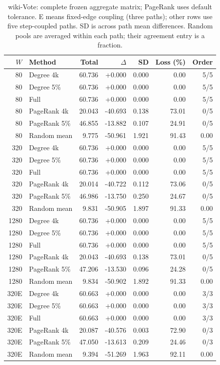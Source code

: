 \clearpage
\begin{table}[htbp]
\caption{wiki-Vote: complete frozen aggregate matrix; PageRank uses default tolerance. E means fixed-edge coupling (three paths); other rows use five step-coupled paths. SD is across path mean differences. Random pools are averaged within each path; their agreement entry is a fraction.}\label{tab:s-wiki_vote}
\begin{tabular}{rlrrrrr}
\toprule
$W$ & Method & Total & $\Delta$ & SD & Loss (\%) & Order \\
\midrule
80 & Degree 4k & 60.736 & +0.000 & 0.000 & 0.00 & 5/5 \\
80 & Degree 5\% & 60.736 & +0.000 & 0.000 & 0.00 & 5/5 \\
80 & Full & 60.736 & +0.000 & 0.000 & 0.00 & 5/5 \\
80 & PageRank 4k & 20.043 & -40.693 & 0.138 & 73.01 & 0/5 \\
80 & PageRank 5\% & 46.855 & -13.882 & 0.107 & 24.91 & 0/5 \\
80 & Random mean & 9.775 & -50.961 & 1.921 & 91.43 & 0.00 \\
320 & Degree 4k & 60.736 & +0.000 & 0.000 & 0.00 & 5/5 \\
320 & Degree 5\% & 60.736 & +0.000 & 0.000 & 0.00 & 5/5 \\
320 & Full & 60.736 & +0.000 & 0.000 & 0.00 & 5/5 \\
320 & PageRank 4k & 20.014 & -40.722 & 0.112 & 73.06 & 0/5 \\
320 & PageRank 5\% & 46.986 & -13.750 & 0.250 & 24.67 & 0/5 \\
320 & Random mean & 9.831 & -50.905 & 1.897 & 91.33 & 0.00 \\
1280 & Degree 4k & 60.736 & +0.000 & 0.000 & 0.00 & 5/5 \\
1280 & Degree 5\% & 60.736 & +0.000 & 0.000 & 0.00 & 5/5 \\
1280 & Full & 60.736 & +0.000 & 0.000 & 0.00 & 5/5 \\
1280 & PageRank 4k & 20.043 & -40.693 & 0.138 & 73.01 & 0/5 \\
1280 & PageRank 5\% & 47.206 & -13.530 & 0.096 & 24.28 & 0/5 \\
1280 & Random mean & 9.834 & -50.902 & 1.892 & 91.33 & 0.00 \\
320E & Degree 4k & 60.663 & +0.000 & 0.000 & 0.00 & 3/3 \\
320E & Degree 5\% & 60.663 & +0.000 & 0.000 & 0.00 & 3/3 \\
320E & Full & 60.663 & +0.000 & 0.000 & 0.00 & 3/3 \\
320E & PageRank 4k & 20.087 & -40.576 & 0.003 & 72.90 & 0/3 \\
320E & PageRank 5\% & 47.050 & -13.613 & 0.209 & 24.46 & 0/3 \\
320E & Random mean & 9.394 & -51.269 & 1.963 & 92.11 & 0.00 \\
\bottomrule
\end{tabular}
\end{table}
